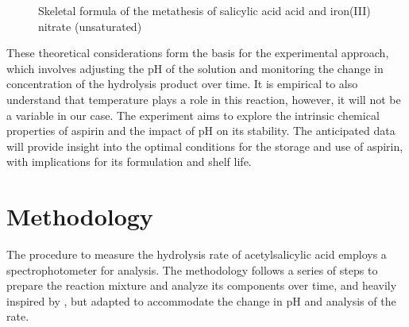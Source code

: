 \documentclass{article}
\begin{document}
\begin{figure}[H]
\begin{tikzpicture}[x=0.75pt,y=0.75pt,yscale=-1,xscale=1]
    
\end{tikzpicture}
\caption{Skeletal formula of the metathesis of salicylic acid acid and iron(III) nitrate (unsaturated)} 
\label{fig: Skeletal formula of the metathesis salicylic acid acid and iron(III) nitrate (unsaturated)}
\end{figure}

These theoretical considerations form the basis for the experimental approach, which involves adjusting the pH of the solution and monitoring the change in concentration of the hydrolysis product over time. It is empirical to also understand that temperature plays a role in this reaction, however, it will not be a variable in our case. The experiment aims to explore the intrinsic chemical properties of aspirin and the impact of pH on its stability. The anticipated data will provide insight into the optimal conditions for the storage and use of aspirin, with implications for its formulation and shelf life.

\section{Methodology}

The procedure to measure the hydrolysis rate of acetylsalicylic acid employs a spectrophotometer for analysis. The methodology follows a series of steps to prepare the reaction mixture and analyze its components over time, and heavily inspired by \cite{RCSpaperexperiment}, but adapted to accommodate the change in pH and analysis of the rate.
\end{document}
